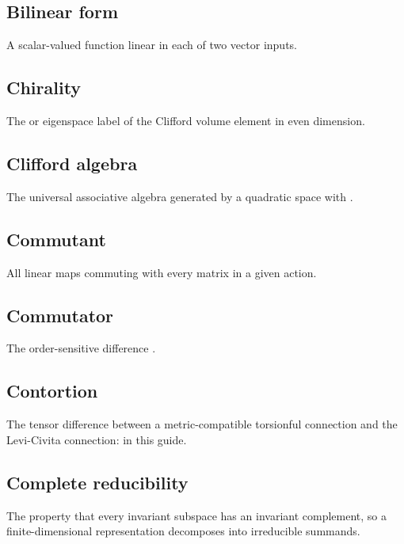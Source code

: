 \documentclass[11pt]{article}
\begin{document}
\subsection{Bilinear form}

A scalar-valued function linear in each of two vector inputs.

\subsection{Chirality}

The \texttt{} or \texttt{} eigenspace label of the Clifford volume element in even dimension.

\subsection{Clifford algebra}

The universal associative algebra generated by a quadratic space with \texttt{}.

\subsection{Commutant}

All linear maps commuting with every matrix in a given action.

\subsection{Commutator}

The order-sensitive difference \texttt{}.

\subsection{Contortion}

The tensor difference between a metric-compatible torsionful connection and the Levi-Civita connection: \texttt{} in this guide.

\subsection{Complete reducibility}

The property that every invariant subspace has an invariant complement, so a finite-dimensional representation decomposes into irreducible summands.
\end{document}
